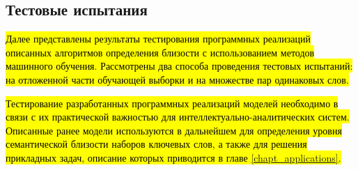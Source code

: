 
\subsection{Тестовые испытания}
\hl{Далее представлены результаты тестирования программных реализаций описанных алгоритмов определения близости с использованием методов машинного обучения. Рассмотрены два способа проведения тестовых испытаний: на отложенной части обучающей выборки и на множестве пар одинаковых слов.}

\hl{Тестирование разработанных программных реализаций моделей необходимо в связи с их практической важностью для интеллектуально-аналитических систем. Описанные ранее модели используются в дальнейшем для определения уровня семантической близости наборов ключевых слов, а также для решения прикладных задач, описание которых приводится в главе \ref{chapt_applications}. }

